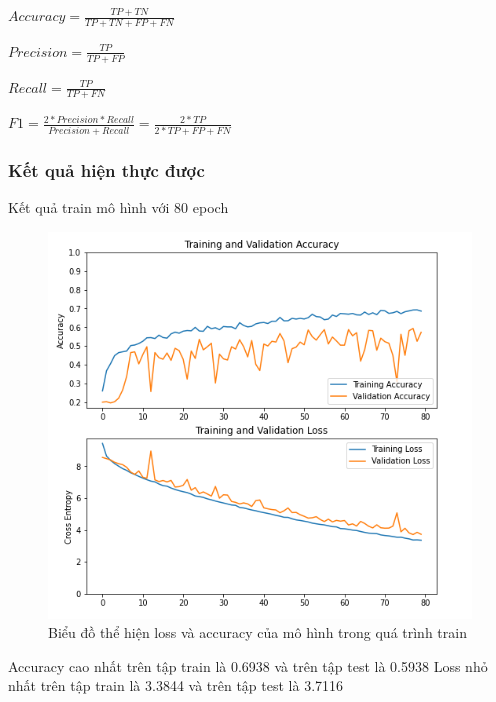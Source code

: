 $Accuracy = \frac{TP+TN}{TP+TN+FP+FN}$

$Precision = \frac{TP}{TP+FP}$

$Recall = \frac{TP}{TP+FN}$

$F1 = \frac{2*Precision*Recall}  
{Precision+Recall} = \frac{2*TP}{2*TP+FP+FN}$
\subsubsection{Kết quả  hiện thực được } %
Kết quả train mô hình với 80 epoch
\begin{figure}[H]
    \centering
    \includegraphics[width=\linewidth]{images/Quanh/graph.png}
    \caption{ Biểu đồ thể hiện loss và accuracy của mô hình trong quá trình train}
    \label{fig:graph}
\end{figure}
Accuracy cao nhất trên tập train là 0.6938 và trên tập test là 0.5938
Loss nhỏ nhất trên tập train là 3.3844 và trên tập test là 3.7116

